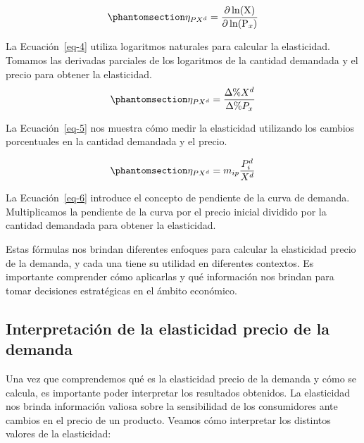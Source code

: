 \documentclass[
  jou,
  floatsintext,
  longtable,
  a4paper,
  nolmodern,
  notxfonts,
  notimes,
  12pt,
  colorlinks=true,linkcolor=blue,citecolor=blue,urlcolor=blue]{apa7}
\begin{document}
\begin{equation}\protect\phantomsection\label{eq-4}{
\eta _{PX^d} = \frac{\partial \ln(\mathrm X)}{\partial  \ln(\mathrm P_x)}
}\end{equation}

La Ecuación~\ref{eq-4} utiliza logaritmos naturales para calcular la
elasticidad. Tomamos las derivadas parciales de los logaritmos de la
cantidad demandada y el precio para obtener la elasticidad.
\begin{equation}\protect\phantomsection\label{eq-5}{
\eta _{PX^d} = \frac{\Delta \% X^d}{\Delta \% P_x}
}\end{equation}

La Ecuación~\ref{eq-5} nos muestra cómo medir la elasticidad utilizando
los cambios porcentuales en la cantidad demandada y el precio.

\begin{equation}\protect\phantomsection\label{eq-6}{
\eta_{PX^d} = m_{ip} \frac{P_i^d}{X^d}
}\end{equation}

La Ecuación~\ref{eq-6} introduce el concepto de pendiente de la curva de
demanda. Multiplicamos la pendiente de la curva por el precio inicial
dividido por la cantidad demandada para obtener la elasticidad.

Estas fórmulas nos brindan diferentes enfoques para calcular la
elasticidad precio de la demanda, y cada una tiene su utilidad en
diferentes contextos. Es importante comprender cómo aplicarlas y qué
información nos brindan para tomar decisiones estratégicas en el ámbito
económico.

\subsection{Interpretación de la elasticidad precio de la
demanda}\label{interpretaciuxf3n-de-la-elasticidad-precio-de-la-demanda}

Una vez que comprendemos qué es la elasticidad precio de la demanda y
cómo se calcula, es importante poder interpretar los resultados
obtenidos. La elasticidad nos brinda información valiosa sobre la
sensibilidad de los consumidores ante cambios en el precio de un
producto. Veamos cómo interpretar los distintos valores de la
elasticidad:
\end{document}
